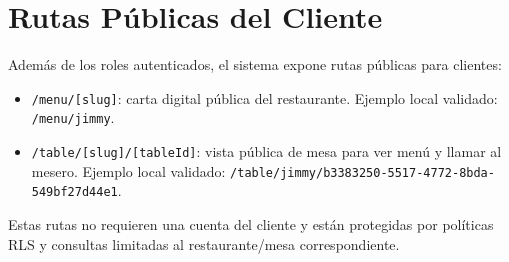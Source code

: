 \section{Rutas Públicas del Cliente}

Además de los roles autenticados, el sistema expone rutas públicas para clientes:

\begin{itemize}[leftmargin=1.5em]
  \item \texttt{/menu/[slug]}: carta digital pública del restaurante. Ejemplo local validado: \texttt{/menu/jimmy}.
  \item \texttt{/table/[slug]/[tableId]}: vista pública de mesa para ver menú y llamar al mesero. Ejemplo local validado: \texttt{/table/jimmy/b3383250-5517-4772-8bda-549bf27d44e1}.
\end{itemize}

Estas rutas no requieren una cuenta del cliente y están protegidas por políticas
RLS y consultas limitadas al restaurante/mesa correspondiente.
